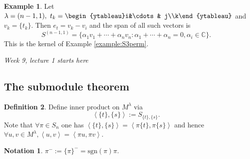 \documentclass[a4paper]{article}
\newcommand{\sgn}{\text{sgn}}
\newcommand{\la}{\left\langle}
\newcommand{\ra}{\right\rangle}
\newcommand{\C}{\mathbb{C}}
\theoremstyle{definition}
\newtheorem{defn}{Definition}[subsection]
\newtheorem{example}[defn]{Example}
\newtheorem*{notation}{Notation}
\begin{document}
\begin{example}
Let $\lambda=(n-1,1),\ t_k=\begin{ytableau}i&\cdots & j\\k\end{ytableau}$ and $v_k=\{t_k\}$. Then $e_t=v_k-v_i$ and the span of all such vectors is
\[
S^{(n-1,1)}=\{\alpha_1 v_1+\cdots+\alpha_n v_n : \alpha_1+\cdots+\alpha_n=0,\alpha_i\in\C\}.
\]
This is the kernel of Example \ref{example:S3perm}.
\end{example}

\begin{flushright}
\textit{Week 9, lecture 1 starts here}
\end{flushright}

\subsection{The submodule theorem}
\begin{defn}
Define inner product on $M^\lambda$ via
\[
\la \{t\},\{s\}\ra := S_{\{t\},\{s\}}.
\]
Note that $\forall\pi\in S_n$ one has $\la \{t\},\{s\}\ra=\la \pi\{t\},\pi\{s\}\ra$ and hence $\forall u,v\in M^\lambda, \la u,v\ra=\la \pi u,\pi v\ra$.
\end{defn}

\begin{notation}
$\pi^-:=\{\pi\}^-=\sgn(\pi)\pi$.
\end{notation}
\end{document}
